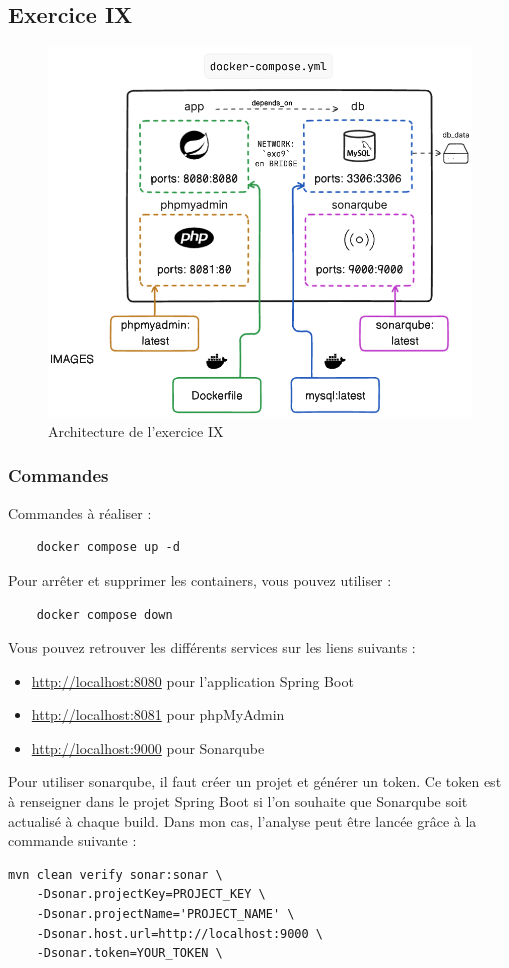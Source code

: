 \subsection*{Exercice IX}
\begin{figure}[hbtp]
    \centering
    \includegraphics[width=\textwidth]{images/exo9.png}
    \caption{Architecture de l'exercice IX}
    \label{fig:exo9}
\end{figure}
\subsubsection*{Commandes}
Commandes à réaliser :
    
\begin{verbatim}
    docker compose up -d
\end{verbatim}
Pour arrêter et supprimer les containers, vous pouvez utiliser :

\begin{verbatim}
    docker compose down
\end{verbatim}
Vous pouvez retrouver les différents services sur les liens suivants :
\begin{itemize}
    \item \href{http://localhost:8080}{http://localhost:8080} pour l'application Spring Boot
    \item \href{http://localhost:8081}{http://localhost:8081} pour phpMyAdmin
    \item \href{http://localhost:9000}{http://localhost:9000} pour 
    Sonarqube
\end{itemize}
Pour utiliser sonarqube, il faut créer un projet et générer un token. Ce token est à renseigner dans le projet Spring Boot si l'on souhaite que Sonarqube soit actualisé à chaque build. Dans mon cas, l'analyse peut être lancée grâce à la commande suivante :
\begin{verbatim}
mvn clean verify sonar:sonar \
    -Dsonar.projectKey=PROJECT_KEY \
    -Dsonar.projectName='PROJECT_NAME' \
    -Dsonar.host.url=http://localhost:9000 \
    -Dsonar.token=YOUR_TOKEN \
\end{verbatim}

